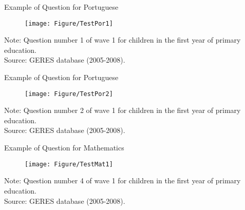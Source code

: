 \documentclass{beamer}
\begin{document}
\begin{frame}{Example of Question for Portuguese}
\vspace{-0.5cm}
\begin{figure}[htb]
\vspace{-0.5cm}
\centering
\texttt{[image: Figure/TestPor1]}
\end{figure}
     \vspace{-1.72cm}  \hspace{-1pt}
\begin{minipage}{1\textwidth} 
{{\fontsize{4}{4}\selectfont
Note: Question number 1 of wave 1 for children in the first year of primary education. \\  
Source: GERES database (2005-2008).\par}}
\end{minipage} 
\end{frame}

\begin{frame}{Example of Question for Portuguese}
\vspace{-0.5cm}
\begin{figure}[htb]
\vspace{-0.5cm}
\centering
\texttt{[image: Figure/TestPor2]}
\end{figure}
     \vspace{-1.72cm}  \hspace{-1pt}
\begin{minipage}{1\textwidth} 
{{\fontsize{4}{4}\selectfont
Note: Question number 2 of wave 1 for children in the first year of primary education. \\  
Source: GERES database (2005-2008).\par}}
\end{minipage} 
\end{frame}

\begin{frame}{Example of Question for Mathematics}
\vspace{-0.5cm}
\begin{figure}[htb]
\vspace{-0.5cm}
\centering
\texttt{[image: Figure/TestMat1]}
\end{figure}
     \vspace{-1.72cm}  \hspace{-1pt}
\begin{minipage}{1\textwidth} 
{{\fontsize{4}{4}\selectfont
Note: Question number 4 of wave 1 for children in the first year of primary education. \\  
Source: GERES database (2005-2008).\par}}
\end{minipage} 
\end{frame}
\end{document}
